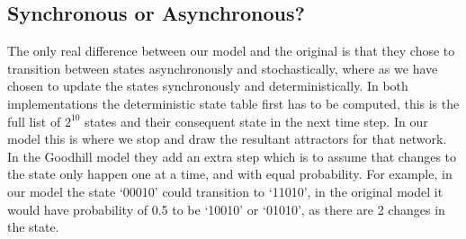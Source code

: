 \documentclass[a4paper,11pt]{article}
\begin{document}


\subsection{Synchronous or Asynchronous?}
The only real difference between our model and the original is that they chose to transition between states asynchronously and stochastically, where as we have chosen to update the states synchronously and deterministically. In both implementations the deterministic state table first has to be computed, this is the full list of $2^{10}$ states and their consequent state in the next time step. In our model this is where we stop and draw the resultant attractors for that network. In the Goodhill model they add an extra step which is to assume that changes to the state only happen one at a time, and with equal probability. For example, in our model the state `00010' could transition to `11010', in the original model it would have probability of 0.5 to be `10010' or `01010', as there are 2 changes in the state.\par
\end{document}
